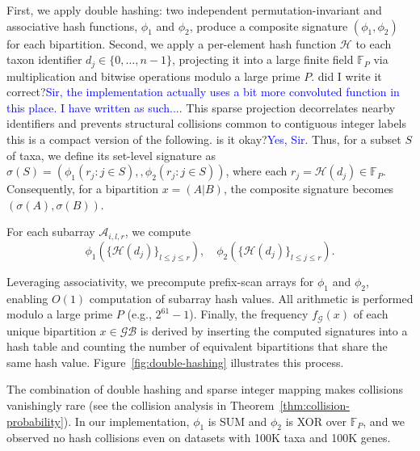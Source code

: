 \documentclass[10pt,a4paper]{article}
\newcommand{\addr}[1]{{\color{red} #1}}
\begin{document}
 First, we apply double hashing: two independent permutation-invariant and associative hash functions, $\phi_1$ and $\phi_2$, produce a composite signature $(\phi_1, \phi_2)$ for each bipartition.
Second, we apply a per-element hash function $\mathcal{H}$ to each taxon identifier $d_j \in \{0,\ldots,n-1\}$, projecting it into a large finite field $\mathbb{F}_P$ via multiplication and bitwise operations modulo a large prime $P$. \addr{did I write it correct?}\textcolor{blue}{Sir, the implementation actually uses a bit more convoluted function in this place. I have written as such...}. This sparse projection decorrelates nearby identifiers and prevents structural collisions common to contiguous integer labels \addr{this is a compact version of the following. is it okay?}\textcolor{blue}{Yes, Sir}. Thus, for a subset $S$ of taxa, we define its set-level signature as $\sigma(S) = (\phi_1({r_j : j \in S}),, \phi_2({r_j : j \in S}))$, where each $r_j = \mathcal{H}(d_j) \in \mathbb{F}_P$. Consequently, for a bipartition $x = (A|B)$, the composite signature becomes $(\sigma(A), \sigma(B))$.


For each subarray $\mathcal{A}_{i,l,r}$, we compute
\[
\phi_1(\{\mathcal{H}(d_j)\}_{l \le j \le r}), \quad
\phi_2(\{\mathcal{H}(d_j)\}_{l \le j \le r}).
\]

Leveraging associativity, we precompute prefix-scan arrays for $\phi_1$ and $\phi_2$, enabling $O(1)$ computation of subarray hash values. All arithmetic is performed modulo a large prime $P$ (e.g., $2^{61}-1$). Finally, the frequency $f_\mathcal{G}(x)$ of each unique bipartition $x \in \mathcal{GB}$ is derived by inserting the computed signatures into a hash table and counting the number of equivalent bipartitions that share the same hash value.
Figure~\ref{fig:double-hashing} illustrates this process.

The combination of double hashing and sparse integer mapping makes collisions vanishingly rare (see the collision analysis in Theorem~\ref{thm:collision-probability}). In our implementation, $\phi_1$ is SUM and $\phi_2$ is XOR over $\mathbb{F}_P$, and we observed no hash collisions even on datasets with 100K taxa and 100K genes. 
\end{document}
